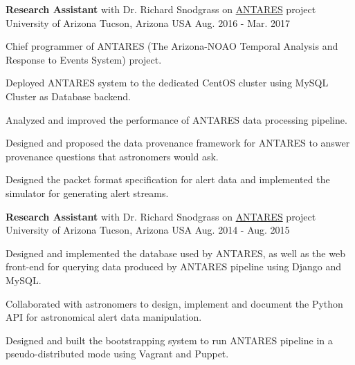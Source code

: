 

\begin{cventries}

  \cventry
    {\textbf{Research Assistant} with Dr. Richard Snodgrass on \href{https://www.noao.edu/ANTARES/}{ANTARES} project} %
    {University of Arizona} %
    {Tucson, Arizona USA} %
    {Aug. 2016 - Mar. 2017} %
    {
      \begin{cvitems} %
        \item {Chief programmer of ANTARES (The Arizona-NOAO Temporal
    Analysis and Response to Events System) project.} 
        \item {Deployed ANTARES system to the dedicated CentOS
    cluster using MySQL Cluster as Database backend.}
        \item {Analyzed and improved the performance of ANTARES data
    processing pipeline.}
        \item {Designed and proposed the data provenance framework for
    ANTARES to answer provenance questions that astronomers would ask.}
        \item {Designed the packet format specification for alert data
        and implemented the simulator for generating alert streams.}
      \end{cvitems}
    }

  \cventry
    {\textbf{Research Assistant} with Dr. Richard Snodgrass on \href{https://www.noao.edu/ANTARES/}{ANTARES} project} %
    {University of Arizona} %
    {Tucson, Arizona USA} %
    {Aug. 2014 - Aug. 2015} %
    {
      \begin{cvitems} %
        \item {Designed and implemented the database used by ANTARES,
    as well as the web front-end for querying data produced by ANTARES
    pipeline using Django and MySQL.} 
        \item {Collaborated with astronomers to design, implement
    and document the Python API for astronomical alert data manipulation.}
        \item {Designed and built the bootstrapping
    system to run ANTARES pipeline in a pseudo-distributed mode
    using Vagrant and Puppet.}
      \end{cvitems}
    }


\end{cventries}
